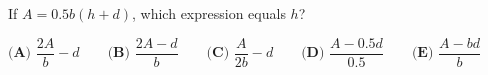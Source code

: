 If $A=0.5b(h+d)$, which expression equals $h$?

$\textbf{(A) }\dfrac{2A}{b}-d\qquad\textbf{(B) }\dfrac{2A-d}{b}\qquad\textbf{(C) }\dfrac{A}{2b}-d\qquad\textbf{(D) }\dfrac{A-0.5d}{0.5}\qquad\textbf{(E) }\dfrac{A-bd}{b}$
